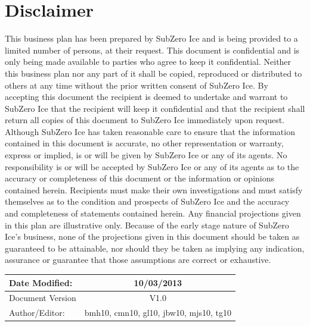 \documentclass{article}
\begin{document}
\begin{titlepage}
\end{titlepage}

\pagebreak

\tableofcontents

\pagebreak


\section{Disclaimer}
This business plan has been prepared by SubZero Ice and is being provided to a limited number of persons, at their request.  This document is confidential and is only being made available to parties who agree to keep it confidential.  Neither this business plan nor any part of it shall be copied, reproduced or distributed to others at any time without the prior written consent of SubZero Ice. By accepting this document the recipient is deemed to undertake and warrant to SubZero Ice that the recipient will keep it confidential and that the recipient shall return all copies of this document to SubZero Ice immediately upon request.
Although SubZero Ice has taken reasonable care to ensure that the information contained in this document is accurate, no other representation or warranty, express or implied, is or will be given by SubZero Ice or any of its agents.  No responsibility is or will be accepted by SubZero Ice or any of its agents as to the accuracy or completeness of this document or the information or opinions contained herein.  Recipients must make their own investigations and must satisfy themselves as to the condition and prospects of SubZero Ice and the accuracy and completeness of statements contained herein.
Any financial projections given in this plan are illustrative only.  Because of the early stage nature of SubZero Ice’s business, none of the projections given in this document should be taken as guaranteed to be attainable, nor should they be taken as implying any indication, assurance or guarantee that those assumptions are correct or exhaustive.

\begin{center}
  \begin{tabular}{ | l | c | }
    \hline
    Date Modified: & 10/03/2013 \\[2ex] \hline
    Document Version & V1.0 \\[2ex] \hline
    Author/Editor: & bmh10, cmn10, gl10, jbw10, mjs10, tg10 \\[2ex]
    \hline
  \end{tabular}
\end{center}
\end{document}
